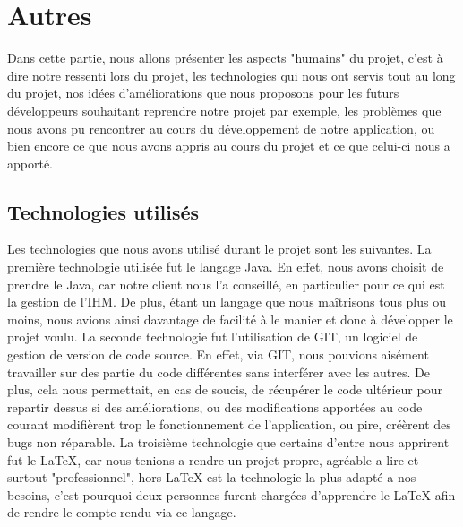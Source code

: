 \section{Autres}
	
	Dans cette partie, nous allons présenter les aspects "humains" du projet, c'est à dire notre ressenti lors du projet, les technologies qui nous ont servis tout au long du projet, nos idées d'améliorations que nous proposons pour les futurs développeurs souhaitant reprendre notre projet par exemple, les problèmes que nous avons pu rencontrer au cours du développement de notre application, ou bien encore ce que nous avons appris au cours du projet et ce que celui-ci nous a apporté.

\subsection{Technologies utilisés}
	Les technologies que nous avons utilisé durant le projet sont les suivantes.\newline
	La première technologie utilisée fut le langage Java. En effet, nous avons choisit de prendre le Java, car notre client nous l'a conseillé, en particulier pour ce qui est la gestion de l'IHM. De plus, étant un langage que nous maîtrisons tous plus ou moins, nous avions ainsi davantage de facilité à le manier et donc à développer le projet voulu.\newline
	La seconde technologie fut l'utilisation de GIT, un logiciel de gestion de version de code source. En effet, via GIT, nous pouvions aisément travailler sur des partie du code différentes sans interférer avec les autres. De plus, cela nous permettait, en cas de soucis, de récupérer le code ultérieur pour repartir dessus si des améliorations, ou des modifications apportées au code courant modifièrent trop le fonctionnement de l'application, ou pire, créèrent des bugs non réparable.\newline
	La troisième technologie que certains d'entre nous apprirent fut le \LaTeX{}, car nous tenions a rendre un projet propre, agréable a lire et surtout "professionnel", hors \LaTeX{} est la technologie la plus adapté a nos besoins, c'est pourquoi deux personnes furent chargées d'apprendre le \LaTeX{} afin de rendre le compte-rendu via ce langage.

